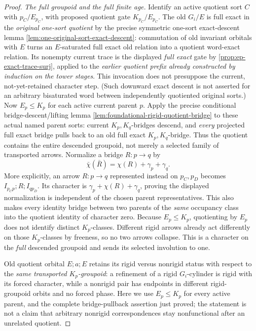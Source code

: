 \begin{proof}
\emph{The full groupoid and the full finite age.}
Identify an active quotient sort \(C\) with
\(p_C/E_{p_C}\), with proposed quotient gate
\(K_{p_C}/E_{p_C}\).
The old \(G_i/E\) is full exact in the
\emph{original one-sort quotient} by the precise
symmetric one-sort exact-descent lemma
\cref{lem:one-original-sort-exact-descent}:
commutation of old invariant orbitals with \(E\)
turns an $E$-saturated full exact old relation
into a quotient word-exact relation.
Its nonempty current trace is the displayed
\emph{full exact} gate by
\cref{prop:ep-exact-trace-surj}, applied to
the \emph{earlier quotient prefix already constructed
by induction on the tower stages}. This invocation
does not presuppose the current, not-yet-retained
character step. (Such downward exact
descent is not asserted for an arbitrary
bisaturated word between independently
quotiented original sorts.)
Now \(E_p\le K_p\) for each active current
parent \(p\). Apply the precise conditional
bridge-descent/lifting lemma
\cref{lem:foundational-rigid-quotient-bridge}
to these actual named parent sorts: current
\(K_p,K_q\)-bridges descend, and \emph{every}
projected full exact bridge pulls back to
an old full exact \(K_p,K_q\)-bridge.
Thus the quotient contains the entire
descended groupoid, not merely a selected
family of transported arrows.
Normalize a bridge \(R:p\to q\) by
\[
  \bar\chi(\bar R)=
           \chi(R)+\gamma_p+\gamma_q .
 \tag{E10}\label{eq:ep-projected-character}
\]
More explicitly, an arrow \(R:p\to q\)
represented instead on \(p_C,p_D\) becomes
\(I_{p_Cp};R;I_{qp_D}\). Its character is
\(\gamma_p+\chi(R)+\gamma_q\), proving the
displayed normalization is independent of
the chosen parent representatives.
This also makes every identity bridge between
two parents of the \emph{same} occupancy class
into the quotient identity of character zero.
Because \(E_p\le K_p\), quotienting by \(E_p\)
does not identify distinct \(K_p\)-classes.
Different rigid arrows already act differently
on those \(K_p\)-classes by freeness, so no two
arrows collapse. This is a character on the
\emph{full} descended groupoid and sends its
selected involution to one.

Old quotient orbital \(E;a;E\) retains its rigid
versus nonrigid status with respect to the \emph{same
transported \(K_p\)-groupoid}: a refinement of a rigid
\(G_i\)-cylinder is rigid with its forced character,
while a nonrigid pair has endpoints in different
rigid-groupoid orbits and no forced phase. Here we
use \(E_p\le K_p\) for every active parent, and
the complete bridge-pullback assertion just proved;
the statement is not a claim that arbitrary
nonrigid correspondences stay nonfunctional after
an unrelated quotient.


\end{proof}
